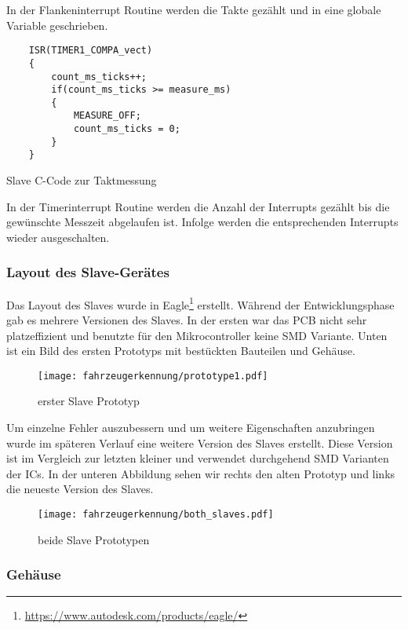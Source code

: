 In der Flankeninterrupt Routine werden die Takte gezählt und in eine globale Variable geschrieben.
\begin{listing}[H]
    \begin{verbatim}
    ISR(TIMER1_COMPA_vect)
    {
        count_ms_ticks++;
        if(count_ms_ticks >= measure_ms)
        {
            MEASURE_OFF;
            count_ms_ticks = 0;
        }
    }
    \end{verbatim}
    \caption{ Slave C-Code zur Taktmessung}
\end{listing}


In der Timerinterrupt Routine werden die Anzahl der Interrupts gezählt bis die gewünschte Messzeit
abgelaufen ist. Infolge werden die entsprechenden Interrupts wieder ausgeschalten.
\subsubsection{Layout des Slave-Gerätes}

Das Layout des Slaves wurde in Eagle\footnote{\url{https://www.autodesk.com/products/eagle/}} erstellt. Während der Entwicklungsphase gab es mehrere
Versionen des Slaves. In der ersten war das PCB nicht sehr platzeffizient und benutzte für den
Mikrocontroller keine SMD Variante. Unten ist ein Bild des ersten Prototyps mit bestückten Bauteilen
und Gehäuse.

\begin{figure}[H]
    \centering
    \texttt{[image: fahrzeugerkennung/prototype1.pdf]}
    \caption{erster Slave Prototyp}
\end{figure}

Um einzelne Fehler auszubessern und um weitere Eigenschaften anzubringen wurde im späteren
Verlauf eine weitere Version des Slaves erstellt. Diese Version ist im Vergleich zur letzten kleiner
und verwendet durchgehend SMD Varianten der ICs. In der unteren Abbildung sehen wir rechts
den alten Prototyp und links die neueste Version des Slaves.

\begin{figure}[H]
    \centering
    \texttt{[image: fahrzeugerkennung/both\_slaves.pdf]}
    \caption{beide Slave Prototypen}
\end{figure}


\subsubsection{Gehäuse}\mbox{} 

